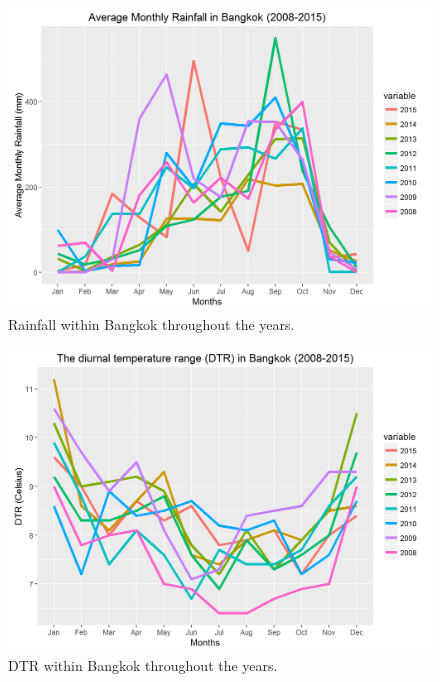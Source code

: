 \documentclass{bmcart}
\begin{document}
\begin{figure}[htbp]
	\begin{center}
		\includegraphics[width= 1.0\textwidth]{1-AvgMonthlyRainfall}
		\caption{Rainfall within Bangkok throughout the years.}
		\label{figure-avg_rain_bangkok}
	\end{center}
\end{figure}

\begin{figure}[htbp]
	\begin{center}
		\includegraphics[width= 1.0\textwidth]{2-AvgMonthlyDTR}
		\caption{DTR within Bangkok throughout the years.}
		\label{figure-avg_temp_bangkok}
	\end{center}
\end{figure}
\end{document}
